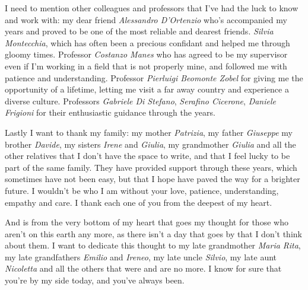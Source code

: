 I need to mention other colleagues and professors that I've had the luck to know
and work with: my dear friend \textit{Alessandro D'Ortenzio} who's accompanied
my years and proved to be one of the most reliable and dearest friends.
\textit{Silvia Montecchia}, which has often been a precious confidant
and helped me through gloomy times. Professor \textit{Costanzo Manes} who
has agreed to be my supervisor even if I'm working in a field that is not properly mine,
and followed me with patience and understanding.
Professor \textit{Pierluigi Beomonte Zobel} for giving me the opportunity of a lifetime, 
letting me visit a far away country and experience a diverse culture.
Professors \textit{Gabriele Di Stefano}, \textit{Serafino Cicerone},
\textit{Daniele Frigioni} for their enthusiastic guidance through the years.

Lastly I want to thank my family: my mother \textit{Patrizia}, my father \textit{Giuseppe}
my brother \textit{Davide}, my sisters \textit{Irene} and \textit{Giulia}, my grandmother \textit{Giulia}
and all the other relatives that I don't have the space to write,
and that I feel lucky to be part of the same family.
They have provided support through these years, which sometimes have not been easy,
but that I hope have paved the way for a brighter future.
I wouldn't be who I am without your love, patience, understanding, empathy and care.
I thank each one of you from the deepest of my heart.

And is from the very bottom of my heart that goes my thought
for those who aren't on this earth any more,
as there isn't a day that goes by that I don't think about them.
I want to dedicate this thought to my late grandmother \textit{Maria Rita},
my late grandfathers \textit{Emilio} and \textit{Ireneo}, my late uncle \textit{Silvio},
my late aunt \textit{Nicoletta} and all the others that were and are no more.
I know for sure that you're by my side today, and you've always been.




\endgroup